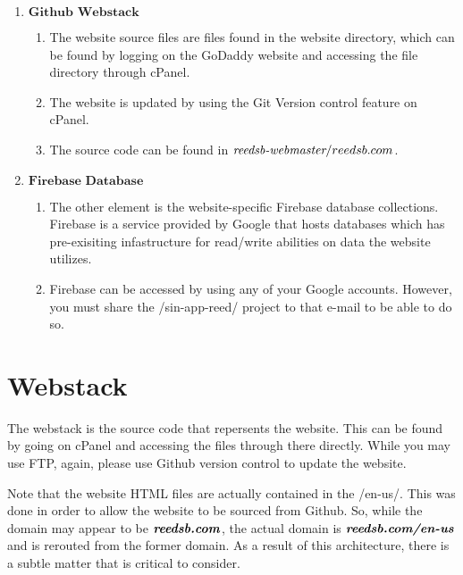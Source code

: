 \documentclass[a4paper]{article}
\begin{document}
\begin{enumerate}
  \item $\textbf{Github Webstack}$
    \begin{enumerate}
      \item The website source files are files found in the website directory, which can be found by logging on the GoDaddy website and accessing the file directory through cPanel.
      \item The website is updated by using the Git Version control feature on cPanel.
      \item The source code can be found in $\textit{reedsb-webmaster}/reedsb.com$.
    \end{enumerate}
  \item $\textbf{Firebase Database}$
    \begin{enumerate}
      \item The other element is the website-specific Firebase database collections. Firebase is a service provided by Google that hosts databases which has pre-exisiting infastructure for read/write abilities on data the website utilizes.
      \item Firebase can be accessed by using any of your Google accounts. However, you must share the /sin-app-reed/ project to that e-mail to be able to do so.
    \end{enumerate}
\end{enumerate}

%

\newpage
\section{Webstack}

The webstack is the source code that repersents the website. This can be found by going on cPanel and accessing the files through there directly. While you may use FTP, again, please use Github version control to update the website.

Note that the website HTML files are actually contained in the /en-us/. This was done in order to allow the website to be sourced from Github. So, while the domain may appear to be $\textbf{\textit{reedsb.com}}$, the actual domain is $\textbf{\textit{reedsb.com/en-us}}$ and is rerouted from the former domain. As a result of this architecture, there is a subtle matter that is critical to consider.
\end{document}
